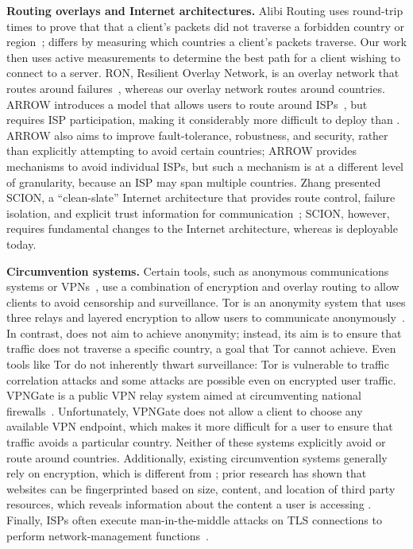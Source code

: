 {\bf Routing overlays and Internet architectures.} Alibi Routing uses
round-trip times to prove that that a client's packets did  not traverse a
forbidden country or region~\cite{levin2015alibi,levin_detour}; \system{} differs by
measuring  which countries a client's packets traverse.  Our
work then  uses active measurements to determine the best path for a client
wishing  to connect to a server.  RON, Resilient Overlay Network, is an
overlay network that  routes around failures~\cite{andersen2001resilient}, whereas our overlay network
routes around countries.  ARROW introduces a
model that allows users to route around ISPs~\cite{peter2015one}, but requires
ISP participation, making it considerably more difficult to deploy than
\system{}. ARROW also aims to improve fault-tolerance, robustness, and
security, rather than explicitly attempting to avoid certain countries; ARROW
provides mechanisms to avoid individual ISPs, but such a mechanism is at a
different level of granularity, because an ISP may span multiple countries.
Zhang \ea{} presented SCION, a ``clean-slate'' Internet architecture that
provides route control, failure isolation, and explicit trust information for
communication~\cite{zhang2011scion}; SCION, however, requires fundamental
changes to the Internet architecture, whereas \system{} is deployable today.

{\bf Circumvention systems.}  Certain tools, such as anonymous
communications systems or VPNs~\cite{dingledine2004tor,nobori2014vpn,piotrowska2017loopix,van2015vuvuzela,wolinsky2012dissent,tyagi2016stadium,corrigan2015riposte,kwon2016atom,kwon2016riffle,
gelernter2016two}, use a combination of
encryption and overlay routing to allow clients to avoid censorship and surveillance. Tor is
an anonymity system that uses three relays and layered encryption to allow
users to communicate anonymously~\cite{dingledine2004tor}.  In contrast,
\system{} does not aim to achieve anonymity; instead, its aim is to ensure
that traffic does not traverse a specific  country, a goal that Tor cannot
achieve.  Even tools like Tor do not inherently thwart surveillance: Tor is
vulnerable to traffic correlation attacks and some attacks are possible even
on encrypted user traffic. VPNGate is a public VPN relay system aimed at
circumventing national firewalls~\cite{nobori2014vpn}. Unfortunately, VPNGate
does not allow a client to choose any available VPN endpoint, which makes it more
difficult for a user to ensure that traffic avoids a particular country.  
Neither of these systems explicitly avoid or route around countries. Additionally, existing circumvention systems generally rely on
encryption, which is different from \system{}; prior research has shown that
websites can be fingerprinted based on size, content, and location of third
party resources, which  reveals information about the content a user is
accessing \cite{what_isps_can_see}.  Finally, ISPs often execute man-in-the-middle attacks on TLS connections to perform network-management
functions~\cite{mitm_isp}.

